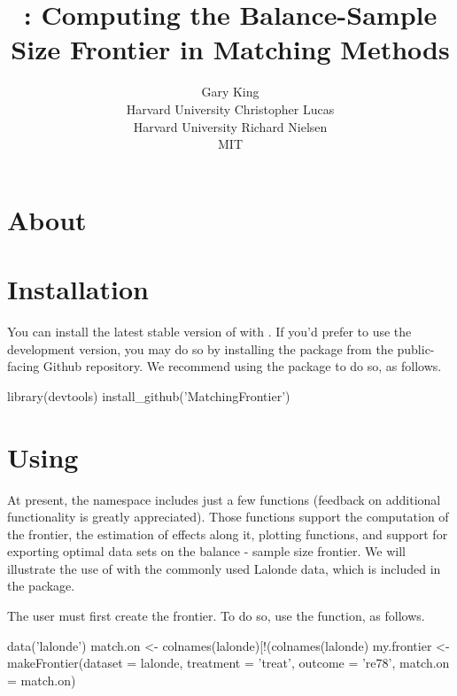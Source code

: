 \documentclass[nojss]{jss}
\author{Gary King\\Harvard University \And 
        Christopher Lucas\\Harvard University \And 
        Richard Nielsen\\MIT}
\title{\pkg{MatchingFrontier}: Computing the Balance-Sample Size Frontier in Matching Methods}
\begin{document}

\section[Introduction]{About }

\section[Usage]{Installation}

You can install the latest stable version of 
with .  If you'd prefer to use the
development version, you may do so by installing the package from the
public-facing Github repository. We recommend using the 
package to do so, as follows.

\begin{Code}
  library(devtools)
  install_github('MatchingFrontier')
\end{Code} 

\section[Usage]{Using }

At present, the  namespace includes just a few
functions (feedback on additional functionality is greatly
appreciated).  Those functions support the computation of the
frontier, the estimation of effects along it, plotting functions, and
support for exporting optimal data sets on the balance - sample size
frontier. We will illustrate the use of  
with the commonly used Lalonde data, which is included in the package.

The user must first create the frontier. To do so, use the 
function, as follows. 

\begin{CodeChunk}
\begin{CodeInput}
  data('lalonde')
  match.on <- colnames(lalonde)[!(colnames(lalonde) %
  my.frontier <- makeFrontier(dataset = lalonde, 
                              treatment = 'treat', 
                              outcome = 're78', 
                              match.on = match.on)
\end{CodeInput}
\end{CodeChunk}
\end{document}

